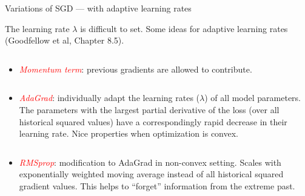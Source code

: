 \documentclass[10pt,ignorenonframetext,]{beamer}
\providecommand{\tightlist}{%
  \setlength{\itemsep}{0pt}\setlength{\parskip}{0pt}}
\begin{document}
\begin{frame}

\begin{block}{Variations of SGD --- with adaptive learning rates}

\vspace{2mm}

The learning rate \(\lambda\) is difficult to set. Some ideas for
adaptive learning rates (Goodfellow et al, Chapter 8.5).

\(~\)

\begin{itemize}
\tightlist
\item
  \emph{\textcolor{red}{Momentum term}}: previous gradients are allowed
  to contribute.
\end{itemize}

\(~\)

\begin{itemize}
\tightlist
\item
  \emph{\textcolor{red}{AdaGrad}}: individually adapt the learning rates
  (\(\lambda\)) of all model parameters. The parameters with the largest
  partial derivative of the loss (over all historical squared values)
  have a correspondingly rapid decrease in their learning rate. Nice
  properties when optimization is convex.
\end{itemize}

\(~\)

\begin{itemize}
\tightlist
\item
  \emph{\textcolor{red}{RMSprop}}: modification to AdaGrad in non-convex
  setting. Scales with exponentially weighted moving average instead of
  all historical squared gradient values. This helps to ``forget''
  information from the extreme past.
\end{itemize}

\end{block}

\end{frame}
\end{document}
